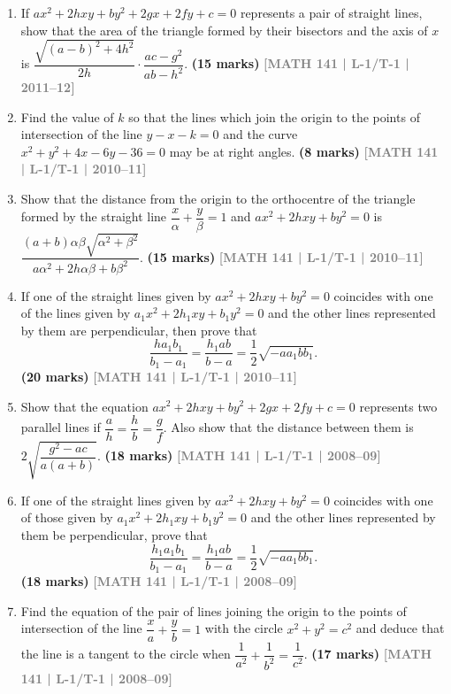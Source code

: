 \documentclass[12pt,a4paper]{article}
\newcommand{\yr}[1]{\hfill\textcolor{gray}{\small\textbf{[#1]}}}
\newcommand{\mk}[1]{\textcolor{orange!70!black}{\small\textbf{(#1 marks)}}}
\begin{document}
\begin{enumerate}
\item If $ax^{2}+2hxy+by^{2}+2gx+2fy+c=0$ represents a pair of straight lines, show that the area of the triangle formed by their bisectors and the axis of $x$ is $\dfrac{\sqrt{(a-b)^{2}+4h^{2}}}{2h}\cdot\dfrac{ac-g^{2}}{ab-h^{2}}$.
\mk{15} \yr{MATH 141 | L-1/T-1 | 2011--12}

\item Find the value of $k$ so that the lines which join the origin to the points of intersection of the line $y-x-k=0$ and the curve $x^{2}+y^{2}+4x-6y-36=0$ may be at right angles.
\mk{8} \yr{MATH 141 | L-1/T-1 | 2010--11}

\item Show that the distance from the origin to the orthocentre of the triangle formed by the straight line $\dfrac{x}{\alpha}+\dfrac{y}{\beta}=1$ and $ax^{2}+2hxy+by^{2}=0$ is
$\dfrac{(a+b)\alpha\beta\sqrt{\alpha^{2}+\beta^{2}}}{a\alpha^{2}+2h\alpha\beta+b\beta^{2}}$.
\mk{15} \yr{MATH 141 | L-1/T-1 | 2010--11}

\item If one of the straight lines given by $ax^{2}+2hxy+by^{2}=0$ coincides with one of the lines given by $a_{1}x^{2}+2h_{1}xy+b_{1}y^{2}=0$ and the other lines represented by them are perpendicular, then prove that
\[
\frac{ha_{1}b_{1}}{b_{1}-a_{1}}=\frac{h_{1}ab}{b-a}=\frac{1}{2}\sqrt{-aa_{1}bb_{1}}.
\]
\mk{20} \yr{MATH 141 | L-1/T-1 | 2010--11}

\item Show that the equation $ax^{2}+2hxy+by^{2}+2gx+2fy+c=0$ represents two parallel lines if $\dfrac{a}{h}=\dfrac{h}{b}=\dfrac{g}{f}$. Also show that the distance between them is $2\sqrt{\dfrac{g^{2}-ac}{a(a+b)}}$.
\mk{18} \yr{MATH 141 | L-1/T-1 | 2008--09}

\item If one of the straight lines given by $ax^{2}+2hxy+by^{2}=0$ coincides with one of those given by $a_{1}x^{2}+2h_{1}xy+b_{1}y^{2}=0$ and the other lines represented by them be perpendicular, prove that
\[
\frac{h_{1}a_{1}b_{1}}{b_{1}-a_{1}}=\frac{h_{1}ab}{b-a}=\frac{1}{2}\sqrt{-aa_{1}bb_{1}}.
\]
\mk{18} \yr{MATH 141 | L-1/T-1 | 2008--09}

\item Find the equation of the pair of lines joining the origin to the points of intersection of the line $\dfrac{x}{a}+\dfrac{y}{b}=1$ with the circle $x^{2}+y^{2}=c^{2}$ and deduce that the line is a tangent to the circle when $\dfrac{1}{a^{2}}+\dfrac{1}{b^{2}}=\dfrac{1}{c^{2}}$.
\mk{17} \yr{MATH 141 | L-1/T-1 | 2008--09}


\end{enumerate}
\end{document}
